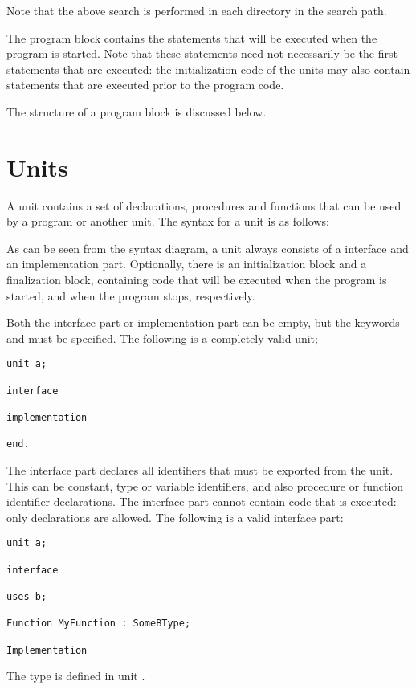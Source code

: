 Note that the above search is performed in each directory in the search
path. 

The program block contains the statements that will be executed when the
program is started. Note that these statements need not necessarily be the 
first statements that are executed: the initialization code of the units
may also contain statements that are executed prior to the program code.

The structure of a program block is discussed below.

\section{Units}
A unit contains a set of declarations, procedures and functions that can be
used by a program or another unit.
The syntax for a unit is as follows:

As can be seen from the syntax diagram, a unit always consists of a
interface and an implementation part. Optionally, there is an initialization
block and a finalization block, containing code that will be executed when
the program is started, and when the program stops, respectively.

Both the interface part or implementation part can be empty, but the
keywords  and  must be specified.
The following is a completely valid unit;
\begin{verbatim}
unit a;

interface

implementation

end.
\end{verbatim}

The interface part declares all identifiers that must be exported from the
unit. This can be constant, type or variable identifiers, and also procedure
or function identifier declarations.  The interface part cannot contain code
that is executed: only declarations are allowed. The following is a valid
interface part:
\begin{verbatim}
unit a;

interface

uses b;

Function MyFunction : SomeBType;

Implementation
\end{verbatim}
The type  is defined in unit .

